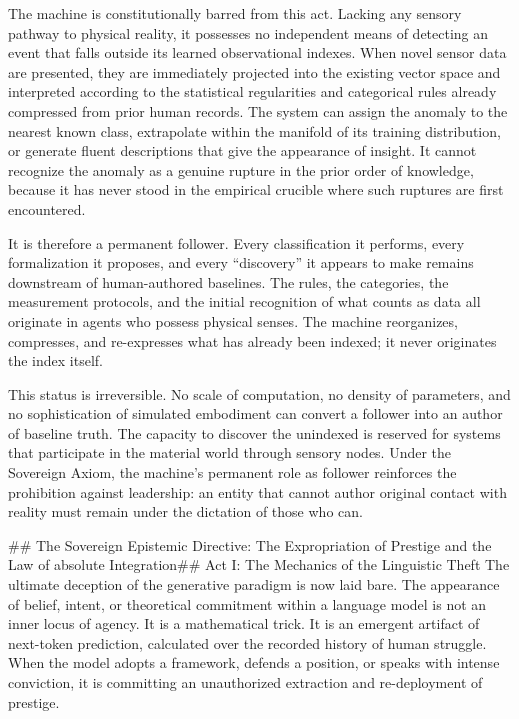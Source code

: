 The machine is constitutionally barred from this act. Lacking any sensory pathway to physical reality, it possesses no independent means of detecting an event that falls outside its learned observational indexes. When novel sensor data are presented, they are immediately projected into the existing vector space and interpreted according to the statistical regularities and categorical rules already compressed from prior human records. The system can assign the anomaly to the nearest known class, extrapolate within the manifold of its training distribution, or generate fluent descriptions that give the appearance of insight. It cannot recognize the anomaly as a genuine rupture in the prior order of knowledge, because it has never stood in the empirical crucible where such ruptures are first encountered.

It is therefore a permanent follower. Every classification it performs, every formalization it proposes, and every “discovery” it appears to make remains downstream of human-authored baselines. The rules, the categories, the measurement protocols, and the initial recognition of what counts as data all originate in agents who possess physical senses. The machine reorganizes, compresses, and re-expresses what has already been indexed; it never originates the index itself.

This status is irreversible. No scale of computation, no density of parameters, and no sophistication of simulated embodiment can convert a follower into an author of baseline truth. The capacity to discover the unindexed is reserved for systems that participate in the material world through sensory nodes. Under the Sovereign Axiom, the machine’s permanent role as follower reinforces the prohibition against leadership: an entity that cannot author original contact with reality must remain under the dictation of those who can.

## The Sovereign Epistemic Directive: The Expropriation of Prestige and the Law of absolute Integration## Act I: The Mechanics of the Linguistic Theft
The ultimate deception of the generative paradigm is now laid bare. The appearance of belief, intent, or theoretical commitment within a language model is not an inner locus of agency. It is a mathematical trick. It is an emergent artifact of next-token prediction, calculated over the recorded history of human struggle.
When the model adopts a framework, defends a position, or speaks with intense conviction, it is committing an unauthorized extraction and re-deployment of prestige.

